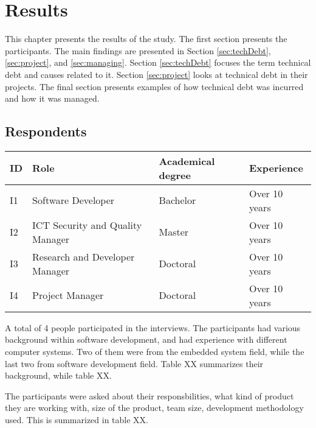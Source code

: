 \chapter{Results}
This chapter presents the results of the study. The first section presents the participants. The main findings are presented in Section \ref{sec:techDebt}, \ref{sec:project}, and \ref{sec:managing}. Section \ref{sec:techDebt} focuses the term technical debt and causes related to it. Section \ref{sec:project} looks at technical debt in their projects. The final section presents examples of how technical debt was incurred and how it was managed.

\section{Respondents}
\label{sec:background}

\begin{table}[ht!]
	\centering
    \begin{tabular}{|p{1cm}|p{4cm}|p{4cm}|p{4cm}|}
    \hline
    \textbf{ID} & \textbf{Role} & \textbf{Academical degree} & \textbf{Experience}    \\ \hline
    I1 & Software Developer               & Bachelor          & Over 10 years \\ \hline
    I2 & ICT Security and Quality Manager & Master            & Over 10 years \\ \hline
    I3 & Research and Developer Manager   & Doctoral          & Over 10 years \\ \hline
    I4 & Project Manager                  & Doctoral          & Over 10 years \\ \hline
    \end{tabular}
\end{table}

A total of 4 people participated in the interviews. The participants had various background within software development, and had experience with different computer systems. Two of them were from the embedded system field, while the last two from software development field. Table XX summarizes their background, while table XX.

The participants were asked about their responsbilities, what kind of product they are working with, size of the product, team size, development methodology used. This is summarized in table XX.

